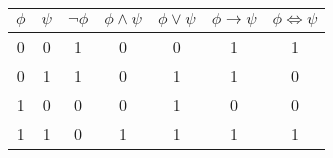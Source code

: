 \documentclass{jarticle}
\begin{document}
	\begin{table}[htbp]

		\begin{tabular}{|c|c||c|c|c|c|c|} \hline

		\(\phi\) & \(\psi\) & \(\lnot \phi\) & \(\phi \land \psi\) & \(\phi \lor \psi\)  & \(\phi \to \psi\) & \(\phi \Leftrightarrow \psi\) \\ \hline
		0 & 0 &           1 &             0 &            0  &          1  &                     1   \\ \hline
		0 & 1 &           1 &             0 &            1  &          1  &                     0   \\ \hline
		1 & 0 &           0 &             0 &            1  &          0  &                     0   \\ \hline 
		1 & 1 & 	      0 &             1 &            1  &          1  &                     1   \\ \hline

		\end{tabular}

	\end{table}
\end{document}
